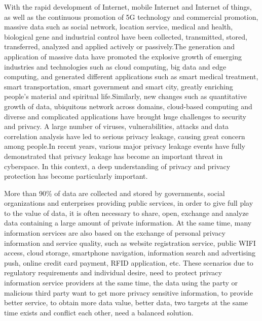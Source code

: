 \documentclass[pdftex,notypeinfo,twoside,openany,UTF8,fntef]{CASthesis}
\theoremstyle{THrm}{
	\newtheorem{question}{Question}[section]
	\newtheorem{property}{性质}[section]
	\newtheorem{assumption}{假设}[section]
	\newtheorem{claim}[lemma]{断言}
	
}
\begin{document}
With the rapid development of Internet, mobile Internet and Internet of things, as well as the continuous promotion of 5G technology and commercial promotion, massive data such as social network, location service, medical and health, biological gene and industrial control have been collected, transmitted, stored, transferred, analyzed and applied actively or passively.The generation and application of massive data have promoted the explosive growth of emerging industries and technologies such as cloud computing, big data and edge computing, and generated different applications such as smart medical treatment, smart transportation, smart government and smart city, greatly enriching people's material and spiritual life.Similarly, new changes such as quantitative growth of data, ubiquitous network across domains, cloud-based computing and diverse and complicated applications have brought huge challenges to security and privacy. A large number of viruses, vulnerabilities, attacks and data correlation analysis have led to serious privacy leakage, causing great concern among people.In recent years, various major privacy leakage events have fully demonstrated that privacy leakage has become an important threat in cyberspace. In this context, a deep understanding of privacy and privacy protection has become particularly important.

More than 90\% of data are collected and stored by governments, social organizations and enterprises providing public services, in order to give full play to the value of data, it is often necessary to share, open, exchange and analyze data containing a large amount of private information. At the same time, many information services are also based on the exchange of personal privacy information and service quality, such as website registration service, public WIFI access, cloud storage, smartphone navigation, information search and advertising push, online credit card payment, RFID application, etc. These scenarios due to regulatory requirements and individual desire, need to protect privacy information service providers at the same time, the data using the party or malicious third party want to get more privacy sensitive information, to provide better service, to obtain more data value, better data, two targets at the same time exists and conflict each other, need a balanced solution.
\end{document}
